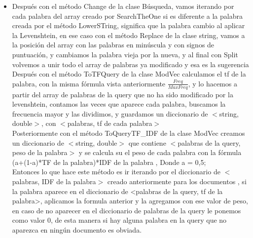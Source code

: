 \documentclass[12pt, a4paper]{article}
\begin{document}
\begin{enumerate}
\begin{itemize}
\begin{itemize}
                        \end{itemize}
                  \item Después con el método Change de la clase Búsqueda,
                        vamos iterando por cada palabra del array creado por SearchTheOne si es diferente
                        a la palabra creada por el método LowerSTring, significa que la palabra
                        cambio al aplicar la Levenshtein, en ese caso con el método Replace de la clase
                        string, vamos a la posición del array con las palabras en minúscula y
                        con signos de puntuación, y cambiamos la palabra vieja por la nueva, y al final
                        con Split volvemos a unir todo el array de palabras ya modificado y esa es la
                        sugerencia\\
                        Después con el método ToTFQuery de la clase ModVec calculamos el
                        tf de la palabra, con la misma fórmula vista anteriormente $\frac{Freq}{MaxFreq}$,
                        y lo hacemos a partir del array de palabras de la query que no ha
                        sido modificado por la levenshtein, contamos las veces que aparece
                        cada palabra, buscamos la frecuencia mayor y las dividimos,
                        y guardamos un diccionario de $<$string, double$>$,
                        con $<$palabras, tf de cada palabra$>$\\
                        Posteriormente con el método ToQueryTF\_IDF de la clase ModVec
                        creamos un diccionario de $<$string, double$>$ que contiene
                        $<$palabras de la query, peso de la palabra$>$ y se calcula su el peso de
                        cada palabra con la fórmula
                        (a+(1-a)*TF de la palabra)*IDF de la palabra , Donde a = 0,5;\\
                        Entonces lo que hace este método es ir iterando por el diccionario de
                        $<$palabras, IDF de la palabra$>$ creado anteriormente para los documentos ,
                        si la palabra aparece en el diccionario de <palabras de la query, tf de la palabra>,
                        aplicamos la formula anterior y la agregamos con ese valor de peso, en caso de no aparecer
                        en el diccionario de palabras de la query le ponemos como valor 0, de esta manera
                        si hay alguna palabra en la query que no aparezca en ningún documento es obviada.\\

\end{itemize}
\end{enumerate}
\end{document}
